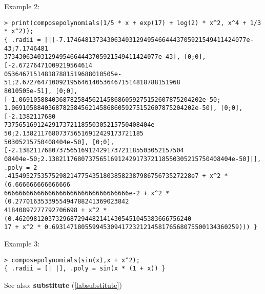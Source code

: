 \noindent Example 2: 
\begin{center}\begin{minipage}{15cm}\begin{Verbatim}[frame=single]
> print(composepolynomials(1/5 * x + exp(17) + log(2) * x^2, x^4 + 1/3 * x^2));
{ .radii = [|[-7.1746481373430634031294954664443705921549411424077e-43;7.1746481
373430634031294954664443705921549411424077e-43], [0;0], [-2.67276471009219564614
053646715148187881519688010505e-51;2.6727647100921956461405364671514818788151968
8010505e-51], [0;0], [-1.06910588403687825845621458686059275152607875204202e-50;
1.06910588403687825845621458686059275152607875204202e-50], [0;0], [-2.1382117680
7375651691242917372118550305215750408404e-50;2.138211768073756516912429173721185
50305215750408404e-50], [0;0], [-2.138211768073756516912429173721185503052157504
08404e-50;2.13821176807375651691242917372118550305215750408404e-50]|], .poly = 2
.41549527535752982147754351803858238798675673527228e7 + x^2 * (6.666666666666666
6666666666666666666666666666666666e-2 + x^2 * (0.2770163533955494788241369023842
41840897277792706698 + x^2 * (0.462098120373296872944821414305451045383666756240
17 + x^2 * 0.693147180559945309417232121458176568075500134360259))) }
\end{Verbatim}
\end{minipage}\end{center}
\noindent Example 3: 
\begin{center}\begin{minipage}{15cm}\begin{Verbatim}[frame=single]
> composepolynomials(sin(x),x + x^2);
{ .radii = [| |], .poly = sin(x * (1 + x)) }
\end{Verbatim}
\end{minipage}\end{center}
See also: \textbf{substitute} (\ref{labsubstitute})
